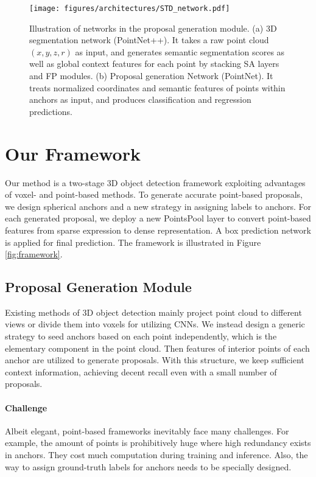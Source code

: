 \documentclass[10pt,twocolumn,letterpaper]{article}
\begin{document}
\begin{figure*}[bpt]
	\centering
	\texttt{[image: figures/architectures/STD\_network.pdf]}\\\vspace{-0.1in}
	\caption{Illustration of networks in the proposal generation module. (a) 3D segmentation network (PointNet++). It takes a raw point cloud $(x, y, z, r)$ as input, and generates semantic segmentation scores as well as global context features for each point by stacking SA layers and FP modules. (b) Proposal generation Network (PointNet). It treats normalized coordinates and semantic features of points within anchors as input, and produces classification and regression predictions.}
	\label{fig:networks}
\end{figure*}

\section{Our Framework}

Our method is a two-stage 3D object detection framework exploiting advantages of voxel- and point-based methods. To generate accurate point-based proposals, we design spherical anchors and a new strategy in assigning labels to anchors. For each generated proposal, we deploy a new PointsPool layer to convert point-based features from sparse expression to dense representation. A box prediction network is applied for final prediction. The framework is illustrated in Figure \ref{fig:framework}.  

\subsection{Proposal Generation Module}

Existing methods of 3D object detection mainly project point cloud to different views or divide them into voxels for utilizing CNNs. We instead design a generic strategy to seed anchors based on each point independently, which is the elementary component in the point cloud. Then features of interior points of each anchor are utilized to generate proposals. With this structure, we keep sufficient context information, achieving decent recall even with a small number of proposals.

\vspace{-0.1in}
\paragraph{Challenge} Albeit elegant, point-based frameworks inevitably face many challenges. For example, the amount of points is prohibitively huge where high redundancy exists in anchors. They cost much computation during training and inference. Also, the way to assign ground-truth labels for anchors needs to be specially designed.
\end{document}

